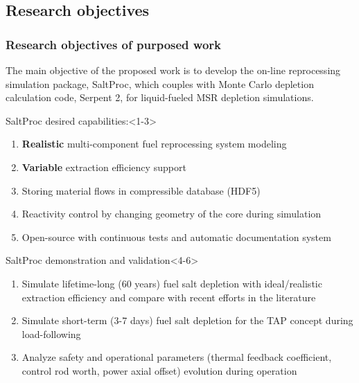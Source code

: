 \subsection{Research objectives}

\begin{frame}
  \frametitle{Research objectives of purposed work}
                  \vspace*{-0.05in}
      The main objective of the proposed work is to develop the 
      on-line 
      reprocessing simulation package, SaltProc, which couples with Monte 
      Carlo depletion calculation code, Serpent 2, for liquid-fueled MSR 
      depletion simulations.
     \begin{block}{SaltProc desired capabilities:}<1-3>
         \begin{enumerate}
                \item \textbf{Realistic} multi-component fuel 
                reprocessing 
                system modeling
                \item \textbf{Variable} extraction efficiency support
                \item Storing material flows in compressible database 
                (HDF5)
                \item<2-3> Reactivity control by changing geometry of 
                the core during simulation
                \item<3> Open-source with continuous tests and 
                automatic documentation system 
         \end{enumerate}
      \end{block}
            \vspace{-0.1in}
	\begin{block}{SaltProc demonstration and validation}<4-6>
		\begin{enumerate}
			\item<4-6> Simulate lifetime-long (60 years) fuel salt 
			depletion with ideal/realistic extraction efficiency and 
			compare with recent efforts in the literature
			\item<5-6> Simulate short-term (3-7 days) fuel salt 
			depletion for the \gls{TAP} concept during load-following
			\item<6> Analyze safety and operational parameters 
			(thermal feedback coefficient, control rod worth, power 
			axial offset) evolution during operation 
		\end{enumerate}
	\end{block}
\end{frame}